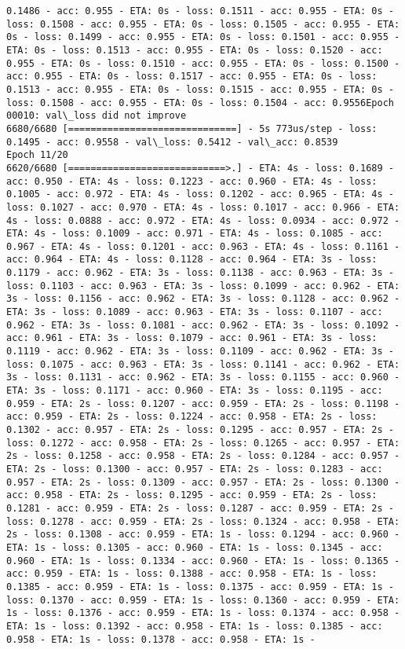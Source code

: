 \documentclass[11pt]{article}
\begin{document}
\begin{Verbatim}[commandchars=\\\{\}]
0.1486 - acc: 0.955 - ETA: 0s - loss: 0.1511 - acc: 0.955 - ETA: 0s - loss: 0.1508 - acc: 0.955 - ETA: 0s - loss: 0.1505 - acc: 0.955 - ETA: 0s - loss: 0.1499 - acc: 0.955 - ETA: 0s - loss: 0.1501 - acc: 0.955 - ETA: 0s - loss: 0.1513 - acc: 0.955 - ETA: 0s - loss: 0.1520 - acc: 0.955 - ETA: 0s - loss: 0.1510 - acc: 0.955 - ETA: 0s - loss: 0.1500 - acc: 0.955 - ETA: 0s - loss: 0.1517 - acc: 0.955 - ETA: 0s - loss: 0.1513 - acc: 0.955 - ETA: 0s - loss: 0.1515 - acc: 0.955 - ETA: 0s - loss: 0.1508 - acc: 0.955 - ETA: 0s - loss: 0.1504 - acc: 0.9556Epoch 00010: val\_loss did not improve
6680/6680 [==============================] - 5s 773us/step - loss: 0.1495 - acc: 0.9558 - val\_loss: 0.5412 - val\_acc: 0.8539
Epoch 11/20
6620/6680 [============================>.] - ETA: 4s - loss: 0.1689 - acc: 0.950 - ETA: 4s - loss: 0.1223 - acc: 0.960 - ETA: 4s - loss: 0.1005 - acc: 0.972 - ETA: 4s - loss: 0.1202 - acc: 0.965 - ETA: 4s - loss: 0.1027 - acc: 0.970 - ETA: 4s - loss: 0.1017 - acc: 0.966 - ETA: 4s - loss: 0.0888 - acc: 0.972 - ETA: 4s - loss: 0.0934 - acc: 0.972 - ETA: 4s - loss: 0.1009 - acc: 0.971 - ETA: 4s - loss: 0.1085 - acc: 0.967 - ETA: 4s - loss: 0.1201 - acc: 0.963 - ETA: 4s - loss: 0.1161 - acc: 0.964 - ETA: 4s - loss: 0.1128 - acc: 0.964 - ETA: 3s - loss: 0.1179 - acc: 0.962 - ETA: 3s - loss: 0.1138 - acc: 0.963 - ETA: 3s - loss: 0.1103 - acc: 0.963 - ETA: 3s - loss: 0.1099 - acc: 0.962 - ETA: 3s - loss: 0.1156 - acc: 0.962 - ETA: 3s - loss: 0.1128 - acc: 0.962 - ETA: 3s - loss: 0.1089 - acc: 0.963 - ETA: 3s - loss: 0.1107 - acc: 0.962 - ETA: 3s - loss: 0.1081 - acc: 0.962 - ETA: 3s - loss: 0.1092 - acc: 0.961 - ETA: 3s - loss: 0.1079 - acc: 0.961 - ETA: 3s - loss: 0.1119 - acc: 0.962 - ETA: 3s - loss: 0.1109 - acc: 0.962 - ETA: 3s - loss: 0.1075 - acc: 0.963 - ETA: 3s - loss: 0.1141 - acc: 0.962 - ETA: 3s - loss: 0.1131 - acc: 0.962 - ETA: 3s - loss: 0.1155 - acc: 0.960 - ETA: 3s - loss: 0.1171 - acc: 0.960 - ETA: 3s - loss: 0.1195 - acc: 0.959 - ETA: 2s - loss: 0.1207 - acc: 0.959 - ETA: 2s - loss: 0.1198 - acc: 0.959 - ETA: 2s - loss: 0.1224 - acc: 0.958 - ETA: 2s - loss: 0.1302 - acc: 0.957 - ETA: 2s - loss: 0.1295 - acc: 0.957 - ETA: 2s - loss: 0.1272 - acc: 0.958 - ETA: 2s - loss: 0.1265 - acc: 0.957 - ETA: 2s - loss: 0.1258 - acc: 0.958 - ETA: 2s - loss: 0.1284 - acc: 0.957 - ETA: 2s - loss: 0.1300 - acc: 0.957 - ETA: 2s - loss: 0.1283 - acc: 0.957 - ETA: 2s - loss: 0.1309 - acc: 0.957 - ETA: 2s - loss: 0.1300 - acc: 0.958 - ETA: 2s - loss: 0.1295 - acc: 0.959 - ETA: 2s - loss: 0.1281 - acc: 0.959 - ETA: 2s - loss: 0.1287 - acc: 0.959 - ETA: 2s - loss: 0.1278 - acc: 0.959 - ETA: 2s - loss: 0.1324 - acc: 0.958 - ETA: 2s - loss: 0.1308 - acc: 0.959 - ETA: 1s - loss: 0.1294 - acc: 0.960 - ETA: 1s - loss: 0.1305 - acc: 0.960 - ETA: 1s - loss: 0.1345 - acc: 0.960 - ETA: 1s - loss: 0.1334 - acc: 0.960 - ETA: 1s - loss: 0.1365 - acc: 0.959 - ETA: 1s - loss: 0.1388 - acc: 0.958 - ETA: 1s - loss: 0.1385 - acc: 0.959 - ETA: 1s - loss: 0.1375 - acc: 0.959 - ETA: 1s - loss: 0.1370 - acc: 0.959 - ETA: 1s - loss: 0.1360 - acc: 0.959 - ETA: 1s - loss: 0.1376 - acc: 0.959 - ETA: 1s - loss: 0.1374 - acc: 0.958 - ETA: 1s - loss: 0.1392 - acc: 0.958 - ETA: 1s - loss: 0.1385 - acc: 0.958 - ETA: 1s - loss: 0.1378 - acc: 0.958 - ETA: 1s - 
\end{Verbatim}
\end{document}
